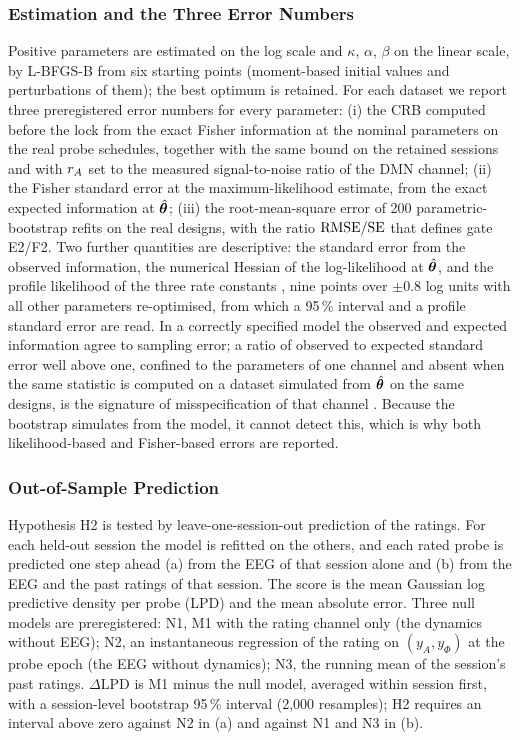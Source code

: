 \subsubsection{Estimation and the Three Error Numbers}
\label{sec:errors}
Positive parameters are estimated on the log scale and $\kappa$, $\alpha$, $\beta$ on the linear scale, by L-BFGS-B \cite{Byrd1995} from six starting points (moment-based initial values and perturbations of them); the best optimum is retained. For each dataset we report three preregistered error numbers for every parameter: (i) the CRB computed before the lock from the exact Fisher information at the nominal parameters on the real probe schedules, together with the same bound on the retained sessions and with $r_{A}$ set to the measured signal-to-noise ratio of the DMN channel; (ii) the Fisher standard error at the maximum-likelihood estimate, from the exact expected information at $\hat{\boldsymbol{\theta}}$; (iii) the root-mean-square error of 200 parametric-bootstrap refits \cite{Efron1993} on the real designs, with the ratio $\mathrm{RMSE}/\mathrm{SE}$ that defines gate E2/F2. Two further quantities are descriptive: the standard error from the observed information, the numerical Hessian of the log-likelihood at $\hat{\boldsymbol{\theta}}$, and the profile likelihood of the three rate constants \cite{Raue2009}, nine points over $\pm0.8$ log units with all other parameters re-optimised, from which a 95\,\% interval and a profile standard error are read. In a correctly specified model the observed and expected information agree to sampling error; a ratio of observed to expected standard error well above one, confined to the parameters of one channel and absent when the same statistic is computed on a dataset simulated from $\hat{\boldsymbol{\theta}}$ on the same designs, is the signature of misspecification of that channel \cite{White1982}. Because the bootstrap simulates from the model, it cannot detect this, which is why both likelihood-based and Fisher-based errors are reported.

\subsubsection{Out-of-Sample Prediction}
\label{sec:loso}
Hypothesis H2 is tested by leave-one-session-out prediction of the ratings. For each held-out session the model is refitted on the others, and each rated probe is predicted one step ahead (a) from the EEG of that session alone and (b) from the EEG and the past ratings of that session. The score is the mean Gaussian log predictive density per probe (LPD) \cite{Vehtari2017} and the mean absolute error. Three null models are preregistered: N1, M1 with the rating channel only (the dynamics without EEG); N2, an instantaneous regression of the rating on $(y_A,y_\Phi)$ at the probe epoch (the EEG without dynamics); N3, the running mean of the session's past ratings. $\Delta\mathrm{LPD}$ is M1 minus the null model, averaged within session first, with a session-level bootstrap 95\,\% interval (2,000 resamples); H2 requires an interval above zero against N2 in (a) and against N1 and N3 in (b).

